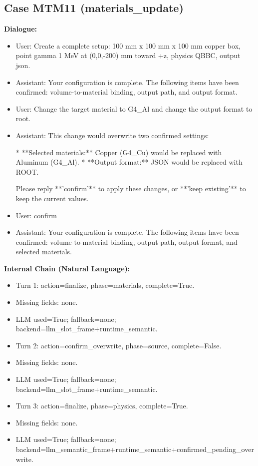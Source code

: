 \documentclass[11pt]{ctexart}
\begin{document}
\subsection{Case MTM11 (materials\_update)}
\textbf{Dialogue:}
\begin{itemize}
\item User: Create a complete setup: 100 mm x 100 mm x 100 mm copper box, point gamma 1 MeV at (0,0,-200) mm toward +z, physics QBBC, output json.
\item Assistant: Your configuration is complete. The following items have been confirmed: volume-to-material binding, output path, and output format.
\item User: Change the target material to G4\_Al and change the output format to root.
\item Assistant: This change would overwrite two confirmed settings:

*   **Selected materials:** Copper (G4\_Cu) would be replaced with Aluminum (G4\_Al).
*   **Output format:** JSON would be replaced with ROOT.

Please reply **'confirm'** to apply these changes, or **'keep existing'** to keep the current values.
\item User: confirm
\item Assistant: Your configuration is complete. The following items have been confirmed: volume-to-material binding, output path, output format, and selected materials.
\end{itemize}
\textbf{Internal Chain (Natural Language):}
\begin{itemize}
\item Turn 1: action=finalize, phase=materials, complete=True.
\item Missing fields: none.
\item LLM used=True; fallback=none; backend=llm\_slot\_frame+runtime\_semantic.
\item Turn 2: action=confirm\_overwrite, phase=source, complete=False.
\item Missing fields: none.
\item LLM used=True; fallback=none; backend=llm\_slot\_frame+runtime\_semantic.
\item Turn 3: action=finalize, phase=physics, complete=True.
\item Missing fields: none.
\item LLM used=True; fallback=none; backend=llm\_semantic\_frame+runtime\_semantic+confirmed\_pending\_overwrite.
\end{itemize}
\end{document}
